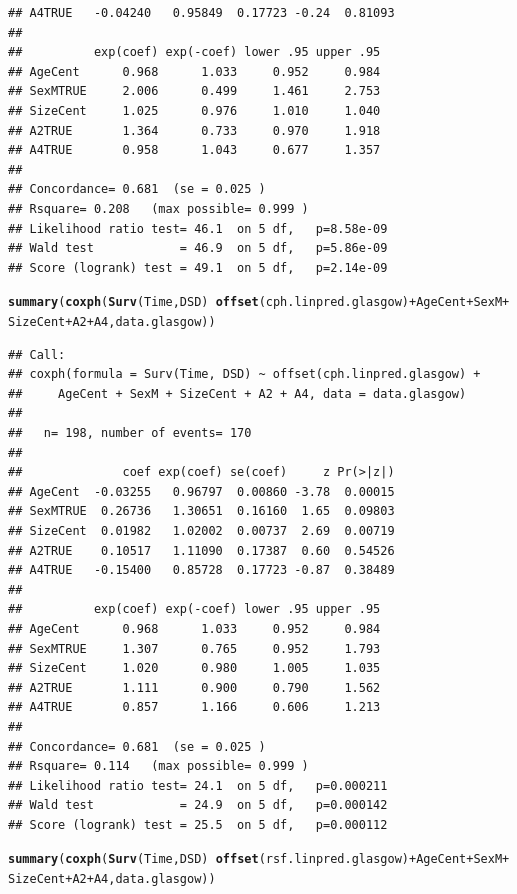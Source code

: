 \documentclass{article}\usepackage[]{graphicx}\usepackage[]{color}
\makeatletter
\newcommand{\hlopt}[1]{\textcolor[rgb]{0,0,0}{#1}}%
\newcommand{\hlstd}[1]{\textcolor[rgb]{0.345,0.345,0.345}{#1}}%
\newcommand{\hlkwd}[1]{\textcolor[rgb]{0.737,0.353,0.396}{\textbf{#1}}}%
\newenvironment{kframe}{%
 \def\at@end@of@kframe{}%
 \ifinner\ifhmode%
  \def\at@end@of@kframe{\end{minipage}}%
  \begin{minipage}{\columnwidth}%
 \fi\fi%
 \def\FrameCommand##1{\hskip\@totalleftmargin \hskip-\fboxsep
 \colorbox{shadecolor}{##1}\hskip-\fboxsep
     \hskip-\linewidth \hskip-\@totalleftmargin \hskip\columnwidth}%
 \MakeFramed {\advance\hsize-\width
   \@totalleftmargin\z@ \linewidth\hsize
   \@setminipage}}%
 {\par\unskip\endMakeFramed%
 \at@end@of@kframe}
\newenvironment{knitrout}{}{} %
\makeatother
\begin{document}
\begin{knitrout}
\begin{kframe}
\begin{verbatim}
## A4TRUE   -0.04240   0.95849  0.17723 -0.24  0.81093
## 
##          exp(coef) exp(-coef) lower .95 upper .95
## AgeCent      0.968      1.033     0.952     0.984
## SexMTRUE     2.006      0.499     1.461     2.753
## SizeCent     1.025      0.976     1.010     1.040
## A2TRUE       1.364      0.733     0.970     1.918
## A4TRUE       0.958      1.043     0.677     1.357
## 
## Concordance= 0.681  (se = 0.025 )
## Rsquare= 0.208   (max possible= 0.999 )
## Likelihood ratio test= 46.1  on 5 df,   p=8.58e-09
## Wald test            = 46.9  on 5 df,   p=5.86e-09
## Score (logrank) test = 49.1  on 5 df,   p=2.14e-09
\end{verbatim}
\begin{alltt}
\hlkwd{summary}\hlstd{(}\hlkwd{coxph}\hlstd{(}\hlkwd{Surv}\hlstd{(Time, DSD)} \hlopt{~} \hlkwd{offset}\hlstd{(cph.linpred.glasgow)} \hlopt{+} \hlstd{AgeCent} \hlopt{+} \hlstd{SexM} \hlopt{+} \hlstd{SizeCent} \hlopt{+} \hlstd{A2} \hlopt{+} \hlstd{A4, data.glasgow))}
\end{alltt}
\begin{verbatim}
## Call:
## coxph(formula = Surv(Time, DSD) ~ offset(cph.linpred.glasgow) + 
##     AgeCent + SexM + SizeCent + A2 + A4, data = data.glasgow)
## 
##   n= 198, number of events= 170 
## 
##              coef exp(coef) se(coef)     z Pr(>|z|)
## AgeCent  -0.03255   0.96797  0.00860 -3.78  0.00015
## SexMTRUE  0.26736   1.30651  0.16160  1.65  0.09803
## SizeCent  0.01982   1.02002  0.00737  2.69  0.00719
## A2TRUE    0.10517   1.11090  0.17387  0.60  0.54526
## A4TRUE   -0.15400   0.85728  0.17723 -0.87  0.38489
## 
##          exp(coef) exp(-coef) lower .95 upper .95
## AgeCent      0.968      1.033     0.952     0.984
## SexMTRUE     1.307      0.765     0.952     1.793
## SizeCent     1.020      0.980     1.005     1.035
## A2TRUE       1.111      0.900     0.790     1.562
## A4TRUE       0.857      1.166     0.606     1.213
## 
## Concordance= 0.681  (se = 0.025 )
## Rsquare= 0.114   (max possible= 0.999 )
## Likelihood ratio test= 24.1  on 5 df,   p=0.000211
## Wald test            = 24.9  on 5 df,   p=0.000142
## Score (logrank) test = 25.5  on 5 df,   p=0.000112
\end{verbatim}
\begin{alltt}
\hlkwd{summary}\hlstd{(}\hlkwd{coxph}\hlstd{(}\hlkwd{Surv}\hlstd{(Time, DSD)} \hlopt{~} \hlkwd{offset}\hlstd{(rsf.linpred.glasgow)} \hlopt{+} \hlstd{AgeCent} \hlopt{+} \hlstd{SexM} \hlopt{+} \hlstd{SizeCent} \hlopt{+} \hlstd{A2} \hlopt{+} \hlstd{A4, data.glasgow))}
\end{alltt}


{\ttfamily\noindent\color{warningcolor}{\#\# Warning in fitter(X, Y, strats, offset, init, control, weights = weights, : Ran out of iterations and did not converge}}

{\ttfamily\noindent\bfseries\color{errorcolor}{\#\# Error in fitter(X, Y, strats, offset, init, control, weights = weights, : NA/NaN/Inf in foreign function call (arg 6)}}\end{kframe}
\end{knitrout}
\end{document}
